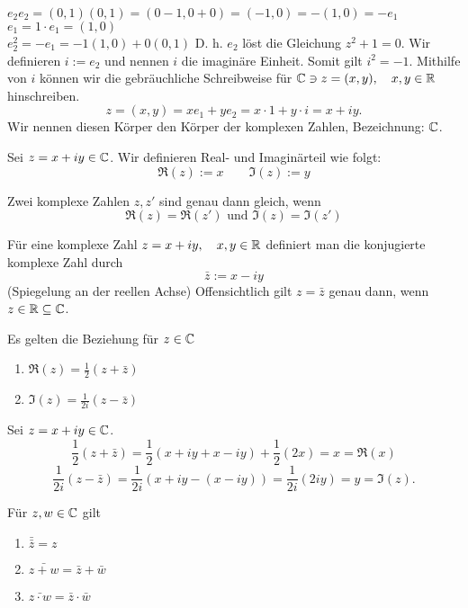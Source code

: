 \documentclass[../ana1.tex]{subfiles}
\begin{document}
\( e_2 e_2 = (0,1)(0,1) = (0-1,0 + 0) = (-1,0) = -(1,0) = -e_1 \) \\
\(e_1 = 1\cdot e_1 = (1,0) \) \\
\( e_2^2 = -e_1 = -1 (1,0) + 0(0,1) \)
D. h. \(e_2\) löst die Gleichung \( z^2+1=0 \). Wir definieren \(i:= e_2\) und nennen \(i\) die imaginäre Einheit. Somit gilt \( i^2 = -1 \). Mithilfe von \(i\) können wir die gebräuchliche Schreibweise für \( \mathbb{C}\ni z = (x,y), \quad x,y\in\mathbb{R} \) hinschreiben.
\[ z = (x,y) = x e_1 + y e_2 = x \cdot 1 + y \cdot i = x + i y. \]
Wir nennen diesen Körper den Körper der komplexen Zahlen, Bezeichnung: \( \mathbb{C} \).
\begin{defi}
	Sei \( z=x+iy\in\mathbb{C} \). Wir definieren Real- und Imaginärteil wie folgt:
	\[ \Re(z) := x \qquad \Im(z):=y \]
\end{defi}
\begin{bem}
	Zwei komplexe Zahlen \( z,z' \) sind genau dann gleich, wenn
	\[ \Re(z)=\Re(z') \text{ und } \Im(z) = \Im(z') \]
\end{bem}
\begin{defi}
	Für eine komplexe Zahl \( z=x+iy, \quad x,y\in\mathbb{R} \) definiert man die konjugierte komplexe Zahl durch
	\[ \bar{z} := x - iy \]
	(Spiegelung an der reellen Achse)
	Offensichtlich gilt \( z=\bar{z} \) genau dann, wenn \( z\in\mathbb{R}\subseteq \mathbb{C} \).
\end{defi}
\begin{lem}
	Es gelten die Beziehung für \( z\in\mathbb{C} \)
	\begin{enumerate}
		\item \(\Re(z) = \frac{1}{2} (z+\bar{z}) \)
		\item \(\Im(z) = \frac{1}{2i} (z-\bar{z}) \)
	\end{enumerate}
\end{lem}
\begin{bew}
	Sei \( z=x+iy\in\mathbb{C} \).
	\[ \frac{1}{2}(z+\bar{z}) = \frac{1}{2}(x+iy + x-iy) + \frac{1}{2}(2x) = x = \Re(x) \]
	\[ \frac{1}{2i}(z-\bar{z}) = \frac{1}{2i}(x+iy - (x-iy)) = \frac{1}{2i}(2iy) = y = \Im(z). \]
\end{bew}
\begin{lem}
	Für \( z,w\in\mathbb{C} \) gilt
	\begin{enumerate}
		\item \( \bar{\bar{z}} = z \)
		\item \( \bar{z+w} = \bar{z} + \bar{w} \)
		\item \( \bar{z\cdot w} = \bar{z} \cdot \bar{w} \)
	\end{enumerate}
\end{lem}
\end{document}

